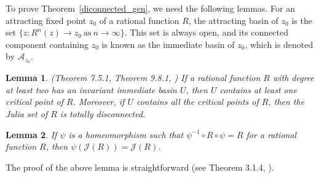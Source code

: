 \documentclass[12pt]{article}
\newtheorem{lem}{Lemma}[section]
\numberwithin{equation}{section}
\begin{document}
\par  
 To prove Theorem~\ref{diconnected_gen}, we need the following lemmas. For an attracting fixed point $z_0$ of a rational function $R$, the attracting basin of $z_0$ is the set $\{z: R^n (z) \to z_0~\mbox{as} ~n \to \infty\}$. This set is always open, and its connected component containing $z_0$ is known as the immediate basin of $z_0$, which is denoted by $\mathcal{A}_{z_0}$.

\begin{lem}\label{totally_disconnected} (Theorem 7.5.1, Theorem 9.8.1, \cite{Beardon_book})
    If a rational function $R$ with degree at least two has an invariant immediate basin $U$, then $U$ contains at least one critical point of $R$. Moreover, if $U$ contains all the critical points of $R$, then the Julia set of $R$ is totally disconnected.
\end{lem}
\begin{lem}
	If $\psi$ is a homeomorphism such that $\psi^{-1} \circ R \circ \psi =R$ for a rational function $R$, then $\psi(\mathcal{J}(R)) =\mathcal{J}(R)$.
	\label{symmetry} 
	\end{lem}
	The proof of the above lemma is straightforward (see Theorem 3.1.4, \cite{Beardon_book}). 
\end{document}
